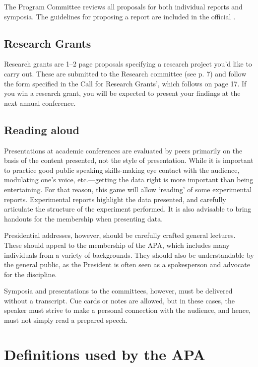 \begin{refsection}
The Program Committee reviews all proposals for both individual reports and symposia. The guidelines for proposing a report are included in the official .

\subsection{Research Grants}
\label{researchgrants}

Research grants are 1--2 page proposals specifying a research project you'd like to carry out. These are submitted to the Research committee (see p. 7) and follow the form specified in the Call for Research Grants', which follows on page 17. If you win a research grant, you will be expected to present your findings at the next annual conference.

\subsection{Reading aloud}
\label{readingaloud}

Presentations at academic conferences are evaluated by peers primarily on the basis of the content presented, not the style of presentation. While it is important to practice good public speaking skills-making eye contact with the audience, modulating one's voice, etc.---getting the data right is more important than being entertaining. For that reason, this game will allow `reading' of some experimental reports. Experimental reports highlight the data presented, and carefully articulate the structure of the experiment performed. It is also advisable to bring handouts for the membership when presenting data.

Presidential addresses, however, should be carefully crafted general lectures. These should appeal to the membership of the APA, which includes many individuals from a variety of backgrounds. They should also be understandable by the general public, as the President is often seen as a spokesperson and advocate for the discipline.

Symposia and presentations to the committees, however, must be delivered without a transcript. Cue cards or notes are allowed, but in these cases, the speaker must strive to make a personal connection with the audience, and hence, must not simply read a prepared speech.

\section{Definitions used by the APA}
\label{definitionsusedbytheapa}


\end{refsection}
